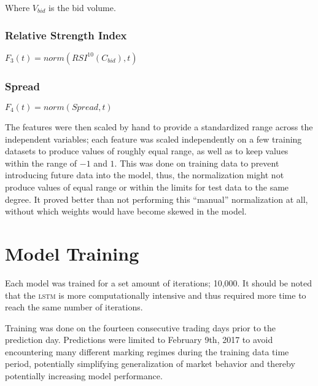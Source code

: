 \begin{multicols}{2}
\noindent Where $V_{bid}$ is the bid volume.

\subsubsection{Relative Strength Index}

\begin{Figure}
  $F_3(t) = {{norm}({RSI^{10}}(C_{bid}), t)}$
\end{Figure}

\subsubsection{Spread}

\begin{Figure}
  $F_4(t) = {{norm}({Spread}, t)}$
\end{Figure}

\noindent The features were then scaled by hand to provide a standardized range
across the independent variables; each feature was scaled independently on a few
training datasets to produce values of roughly equal range, as well as to keep
values within the range of $-1$ and $1$.  This was done on training data to
prevent introducing future data into the model, thus, the normalization might
not produce values of equal range or within the limits for test data to the same
degree.  It proved better than not performing this ``manual'' normalization at
all, without which weights would have become skewed in the model.

\section{Model Training}

Each model was trained for a set amount of iterations; 10,000.  It should be
noted that the \textsc{lstm} is more computationally intensive and thus required
more time to reach the same number of iterations.

Training was done on the fourteen consecutive trading days prior to the
prediction day.  Predictions were limited to February 9th, 2017 to avoid
encountering many different marking regimes during the training data time
period, potentially simplifying generalization of market behavior and thereby
potentially increasing model performance.


\end{multicols}
